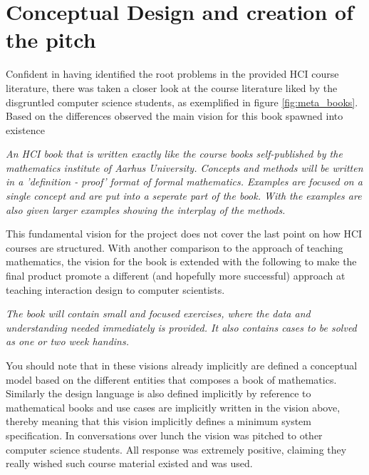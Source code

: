

\section*{Conceptual Design and creation of the pitch}
Confident in having identified the root problems in the provided HCI course literature, there was taken a closer look at the course literature liked by the disgruntled computer science students, as exemplified in figure \ref{fig:meta_books}. Based on the differences observed the main vision for this book spawned into existence

\begin{displayquote}
  \emph{An HCI book that is written exactly like the course books self-published by the mathematics institute of Aarhus University. Concepts and methods will be written in a 'definition - proof' format of formal mathematics. Examples are focused on a single concept and are put into a seperate part of the book. With the examples are also given larger examples showing the interplay of the methods.}
\end{displayquote}

This fundamental vision for the project does not cover the last point on how HCI courses are structured. With another comparison to the approach of teaching mathematics, the vision for the book is extended with the following to make the final product promote a different (and hopefully more successful) approach at teaching interaction design to computer scientists.

\begin{displayquote}
  \emph{The book will contain small and focused exercises, where the data and understanding needed immediately is provided. It also contains cases to be solved as one or two week handins.}
\end{displayquote}

You should note that in these visions already implicitly are defined a conceptual model based on the different entities that composes a book of mathematics. Similarly the design language is also defined implicitly by reference to mathematical books and use cases are implicitly written in the vision above, thereby meaning that this vision implicitly defines a minimum system specification. In conversations over lunch the vision was pitched to other computer science students. All response was extremely positive, claiming they really wished such course material existed and was used.

